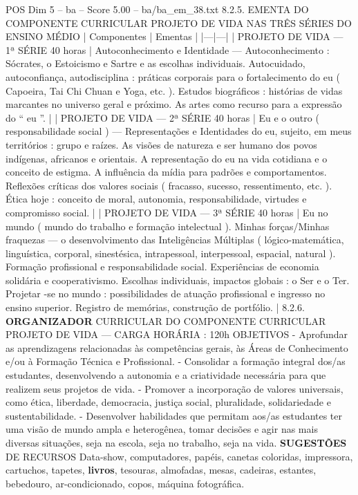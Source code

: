 \begin{textsample}{POS Dim 5 – ba – Score 5.00 – ba/ba\_em\_38.txt}  \label{ex:f5_pos_275}
8.2.5.
EMENTA DO COMPONENTE CURRICULAR PROJETO DE VIDA NAS TRÊS SÉRIES DO ENSINO MÉDIO | Componentes | Ementas | |---|---| | PROJETO DE VIDA — 1ª SÉRIE 40 horas | Autoconhecimento e Identidade — Autoconhecimento : Sócrates, o Estoicismo e Sartre e as escolhas individuais.
Autocuidado, autoconfiança, autodisciplina : práticas corporais para o fortalecimento do eu ( Capoeira, Tai Chi Chuan e Yoga, etc. ).
Estudos biográficos : histórias de vidas marcantes no universo geral e próximo.
As artes como recurso para a expressão do “ eu ”. | | PROJETO DE VIDA — 2ª SÉRIE 40 horas | Eu e o outro ( responsabilidade social ) — Representações e Identidades do eu, sujeito, em meus territórios : grupo e raízes.
As visões de natureza e ser humano dos povos indígenas, africanos e orientais.
A representação do eu na vida cotidiana e o conceito de estigma.
A influência da mídia para padrões e comportamentos.
Reflexões críticas dos valores sociais ( fracasso, sucesso, ressentimento, etc. ).
Ética hoje : conceito de moral, autonomia, responsabilidade, virtudes e compromisso social. | | PROJETO DE VIDA — 3ª SÉRIE 40 horas | Eu no mundo ( mundo do trabalho e formação intelectual ).
Minhas forças/Minhas fraquezas — o desenvolvimento das Inteligências Múltiplas ( lógico-matemática, linguística, corporal, sinestésica, intrapessoal, interpessoal, espacial, natural ).
Formação profissional e responsabilidade social.
Experiências de economia solidária e cooperativismo.
Escolhas individuais, impactos globais : o Ser e o Ter.
Projetar -se no mundo : possibilidades de atuação profissional e ingresso no ensino superior.
Registro de memórias, construção de portfólio. | 8.2.6. \textbf{ORGANIZADOR} CURRICULAR DO COMPONENTE CURRICULAR PROJETO DE VIDA — CARGA HORÁRIA : 120h OBJETIVOS - Aprofundar as aprendizagens relacionadas às competências gerais, às Áreas de Conhecimento e/ou à Formação Técnica e Profissional. - Consolidar a formação integral dos/as estudantes, desenvolvendo a autonomia e a criatividade necessária para que realizem seus projetos de vida. - Promover a incorporação de valores universais, como ética, liberdade, democracia, justiça social, pluralidade, solidariedade e sustentabilidade. - Desenvolver habilidades que permitam aos/as estudantes ter uma visão de mundo ampla e heterogênea, tomar decisões e agir nas mais diversas situações, seja na escola, seja no trabalho, seja na vida. \textbf{SUGESTÕES} DE RECURSOS Data-show, computadores, papéis, canetas coloridas, impressora, cartuchos, tapetes, \textbf{livros}, tesouras, almofadas, mesas, cadeiras, estantes, bebedouro, ar-condicionado, copos, máquina fotográfica.

\end{textsample}
